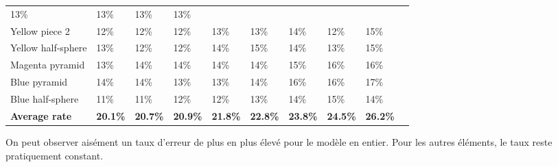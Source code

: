 \documentclass[a4paper, 12pt]{book}
\begin{document}
\begin{table}[H]
\begin{tabular}{c|lllllllll}
\multicolumn{1}{l|}{13\%}  & 
\multicolumn{1}{l|}{13\%}  & 
\multicolumn{1}{l|}{13\%}  & 
\multicolumn{1}{l|}{13\%}  & \\ 
\cline{1-9}
\multicolumn{1}{|l|}{Yellow piece 2}  & 
\multicolumn{1}{l|}{12\%}  & 
\multicolumn{1}{l|}{12\%}  & 
\multicolumn{1}{l|}{12\%}  &  
\multicolumn{1}{l|}{13\%}  & 
\multicolumn{1}{l|}{13\%}  & 
\multicolumn{1}{l|}{14\%}  & 
\multicolumn{1}{l|}{12\%}  & 
\multicolumn{1}{l|}{15\%}  & \\ 
\cline{1-9}
\multicolumn{1}{|l|}{Yellow half-sphere}  & 
\multicolumn{1}{l|}{13\%}  & 
\multicolumn{1}{l|}{12\%}  & 
\multicolumn{1}{l|}{12\%}  &  
\multicolumn{1}{l|}{14\%}  & 
\multicolumn{1}{l|}{15\%}  & 
\multicolumn{1}{l|}{14\%}  & 
\multicolumn{1}{l|}{13\%}  & 
\multicolumn{1}{l|}{15\%}  & 
\\ 
\cline{1-9}
\multicolumn{1}{|l|}{Magenta pyramid}  & 
\multicolumn{1}{l|}{13\%}  & 
\multicolumn{1}{l|}{14\%}  & 
\multicolumn{1}{l|}{14\%}  &  
\multicolumn{1}{l|}{14\%}  & 
\multicolumn{1}{l|}{14\%}  & 
\multicolumn{1}{l|}{15\%}  & 
\multicolumn{1}{l|}{16\%}  & 
\multicolumn{1}{l|}{16\%}  & \\ 
\cline{1-9}
\multicolumn{1}{|l|}{Blue pyramid}  & 
\multicolumn{1}{l|}{14\%}  & 
\multicolumn{1}{l|}{14\%}  & 
\multicolumn{1}{l|}{13\%}  &  
\multicolumn{1}{l|}{13\%}  & 
\multicolumn{1}{l|}{14\%}  & 
\multicolumn{1}{l|}{16\%}  & 
\multicolumn{1}{l|}{16\%}  & 
\multicolumn{1}{l|}{17\%}  & \\ 
\cline{1-9}
\multicolumn{1}{|l|}{Blue  half-sphere}  & 
\multicolumn{1}{l|}{11\%}  & 
\multicolumn{1}{l|}{11\%}  & 
\multicolumn{1}{l|}{12\%}  &  
\multicolumn{1}{l|}{12\%}  & 
\multicolumn{1}{l|}{13\%}  & 
\multicolumn{1}{l|}{14\%}  & 
\multicolumn{1}{l|}{15\%}  & 
\multicolumn{1}{l|}{14\%}  & \\ 
\cline{1-9}
\multicolumn{1}{|l|}{\textbf{Average rate}} & 
\multicolumn{1}{l|}{\textbf{20.1\%}}  & 
\multicolumn{1}{l|}{\textbf{20.7\%}}  &  
\multicolumn{1}{l|}{\textbf{20.9\%}}  & 
\multicolumn{1}{l|}{\textbf{21.8\%}}  & 
\multicolumn{1}{l|}{\textbf{22.8\%}}  & 
\multicolumn{1}{l|}{\textbf{23.8\%}}  & 
\multicolumn{1}{l|}{\textbf{24.5\%}}  &  
\multicolumn{1}{l|}{\textbf{26.2\%}}  &\\ 
\cline{1-9}

\end{tabular}
\end{table}
\vspace{2cm} 
\par On peut observer aisément un taux d'erreur de plus en plus élevé pour le modèle en entier. Pour les autres éléments, le taux reste pratiquement constant. 
\end{document}
